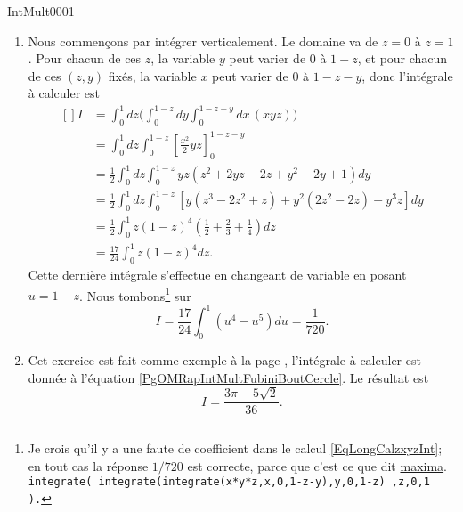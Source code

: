\begin{corrige}{IntMult0001}
\begin{enumerate}
\item
Nous commençons par intégrer verticalement. Le domaine va de $z=0$ à $z=1$. Pour chacun de ces $z$, la variable $y$ peut varier de $0$ à $1-z$, et pour chacun de ces $(z,y)$ fixés, la variable $x$ peut varier de $0$ à $1-z-y$, donc l'intégrale à calculer est
\begin{equation}		\label{EqLongCalzxyzInt}
	\begin{aligned}[]
		I	&=\int_0^1dz\big( \int_0^{1-z}dy\int_0^{1-z-y}dx\, (xyz) \big)\\
			&=\int_0^1dz\int_0^{1-z}\left[ \frac{ x^2 }{ 2 }yz \right]_0^{1-z-y}\\
			&=\frac{ 1 }{2}\int_0^1dz\int_{0}^{1-z}yz(z^2+2yz-2z+y^2-2y+1)dy\\
			&=\frac{ 1 }{2}\int_0^1dz\int_0^{1-z}[y(z^3-2z^2+z)+y^2(2z^2-2z)+y^3z]dy\\
			&=\frac{ 1 }{2}\int_0^1z(1-z)^4\left( \frac{ 1 }{2}+\frac{ 2 }{ 3 }+\frac{1}{ 4 } \right)dz\\
			&=\frac{ 17 }{ 24 }\int_0^1z(1-z)^4dz.
	\end{aligned}
\end{equation}
Cette dernière intégrale s'effectue en changeant de variable en posant $u=1-z$. Nous tombons\footnote{Je crois qu'il y a une faute de coefficient dans le calcul \eqref{EqLongCalzxyzInt}; en tout cas la réponse $1/720$ est correcte, parce que c'est ce que dit \href{http://fr.wikipedia.org/wiki/Maxima}{maxima}.\\
\texttt{integrate( integrate(integrate(x*y*z,x,0,1-z-y),y,0,1-z) ,z,0,1 ).}} sur
\begin{equation}
	I=\frac{ 17 }{ 24 }\int_0^1(u^4-u^5)du=\frac{1}{ 720 }.
\end{equation}

\item
Cet exercice est fait comme exemple à la page \pageref{PgOMRapIntMultFubiniBoutCercle}, l'intégrale à calculer est donnée à l'équation \eqref{PgOMRapIntMultFubiniBoutCercle}. Le résultat est
\begin{equation}
	I=\frac{ 3\pi-5\sqrt{2} }{ 36 }.
\end{equation}

\end{enumerate}

\end{corrige}
